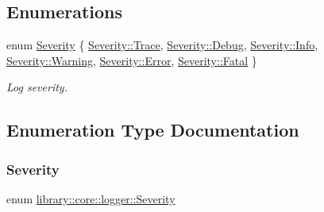 \subsection*{Enumerations}
\begin{DoxyCompactItemize}
\item 
enum \hyperlink{namespacelibrary_1_1core_1_1logger_a35f71353edf64f68f7fe3874b01abaa8}{Severity} \{ \newline
\hyperlink{namespacelibrary_1_1core_1_1logger_a35f71353edf64f68f7fe3874b01abaa8add4ec0ac4e58f7c32a01244ae91150b1}{Severity\+::\+Trace}, 
\hyperlink{namespacelibrary_1_1core_1_1logger_a35f71353edf64f68f7fe3874b01abaa8aa603905470e2a5b8c13e96b579ef0dba}{Severity\+::\+Debug}, 
\hyperlink{namespacelibrary_1_1core_1_1logger_a35f71353edf64f68f7fe3874b01abaa8a4059b0251f66a18cb56f544728796875}{Severity\+::\+Info}, 
\hyperlink{namespacelibrary_1_1core_1_1logger_a35f71353edf64f68f7fe3874b01abaa8a0eaadb4fcb48a0a0ed7bc9868be9fbaa}{Severity\+::\+Warning}, 
\newline
\hyperlink{namespacelibrary_1_1core_1_1logger_a35f71353edf64f68f7fe3874b01abaa8a902b0d55fddef6f8d651fe1035b7d4bd}{Severity\+::\+Error}, 
\hyperlink{namespacelibrary_1_1core_1_1logger_a35f71353edf64f68f7fe3874b01abaa8a882384ec38ce8d9582b57e70861730e4}{Severity\+::\+Fatal}
 \}\begin{DoxyCompactList}\small\item\em Log severity. \end{DoxyCompactList}
\end{DoxyCompactItemize}


\subsection{Enumeration Type Documentation}
\mbox{\label{namespacelibrary_1_1core_1_1logger_a35f71353edf64f68f7fe3874b01abaa8}} 
\subsubsection{\texorpdfstring{Severity}{Severity}}
{\footnotesize\ttfamily enum \hyperlink{namespacelibrary_1_1core_1_1logger_a35f71353edf64f68f7fe3874b01abaa8}{library\+::core\+::logger\+::\+Severity}\hspace{0.3cm}{\ttfamily [strong]}}



